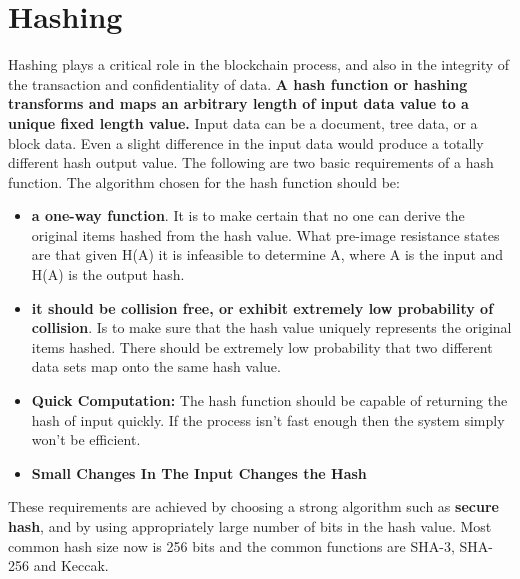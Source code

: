 \documentclass{article}
\begin{document}
\section{Hashing}
Hashing plays a critical role in the blockchain process, and also in the integrity of the transaction and confidentiality of data.  \textbf{A hash function or hashing transforms and maps an arbitrary length of input data value to a unique fixed length value.} Input data can be a document, tree data, or a block data. Even a slight difference in the input data would produce a totally different hash output value. 
The following are two basic requirements of a hash function. The algorithm chosen for the hash function should be:
\begin{itemize}
    \item \textbf{a one-way function}. It is to make certain that no one can derive the original items hashed from the hash value. What pre-image resistance states are that given H(A) it is infeasible to determine A, where A is the input and H(A) is the output hash.
    \item \textbf{it should be collision free, or exhibit extremely low probability of collision}. Is to make sure that the hash value uniquely represents the original items hashed. There should be extremely low probability that two different data sets map onto the same hash value. 
    \item \textbf{Quick Computation:} The hash function should be capable of returning the hash of input quickly. If the process isn’t fast enough then the system simply won’t be efficient.
    \item \textbf{Small Changes In The Input Changes the Hash}
\end{itemize}

These requirements are achieved by choosing a strong algorithm such as \textbf{secure hash}, and by using appropriately large number of bits in the hash value. Most common hash size now is 256 bits and the common functions are SHA-3, SHA-256 and Keccak. 
\par
\end{document}
